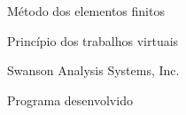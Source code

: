 \documentclass[oneside, a4paper, 12pt, chapter=TITLE]{abntex2} 	%
\begin{document}
\begin{siglas}
		\item[MEF]\quad Método dos elementos finitos
		\item[PTV]\quad Princípio dos trabalhos virtuais
		\item [Ansys]\quad Swanson Analysis Systems, Inc.
		\item[DTruss]\quad Programa desenvolvido
\end{siglas}
\tableofcontents*
\cleardoublepage
\textual
\OnehalfSpacing
\setlength{\parindent}{1.0cm} %






%
\nocite{GID2017}
\nocite{Bandeira2001}
\nocite{Dominicio1977}
\nocite{Abrate1983}
\nocite{Martinelli2017}

\end{document}

